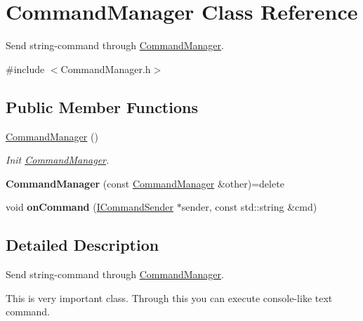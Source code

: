 \hypertarget{class_command_manager}{\section{Command\-Manager Class Reference}
\label{class_command_manager}
}


Send string-\/command through \hyperlink{class_command_manager}{Command\-Manager}.  




{\ttfamily \#include $<$Command\-Manager.\-h$>$}

\subsection*{Public Member Functions}
\begin{DoxyCompactItemize}
\item 
\hyperlink{class_command_manager_a8a13226bf933396a3f35dfb5bee3e813}{Command\-Manager} ()
\begin{DoxyCompactList}\small\item\em Init \hyperlink{class_command_manager}{Command\-Manager}. \end{DoxyCompactList}\item 
\hypertarget{class_command_manager_aeaffe7fa7dd8f1dd45b642120013a076}{{\bfseries Command\-Manager} (const \hyperlink{class_command_manager}{Command\-Manager} \&other)=delete}\label{class_command_manager_aeaffe7fa7dd8f1dd45b642120013a076}

\item 
\hypertarget{class_command_manager_abef8721bbe32e1ecb22f2f3d3b8c0601}{void {\bfseries on\-Command} (\hyperlink{class_i_command_sender}{I\-Command\-Sender} $\ast$sender, const std\-::string \&cmd)}\label{class_command_manager_abef8721bbe32e1ecb22f2f3d3b8c0601}

\end{DoxyCompactItemize}


\subsection{Detailed Description}
Send string-\/command through \hyperlink{class_command_manager}{Command\-Manager}. 

This is very important class. Through this you can execute console-\/like text command. 

